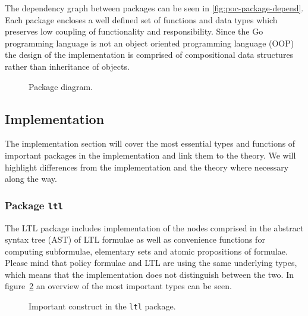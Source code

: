 The dependency graph between packages can be seen in \autoref{fig:poc-package-depend}. Each package encloses a well defined set of functions and data types which preserves low coupling of functionality and responsibility. Since the Go programming language is not an object oriented programming language (OOP) the design of the implementation is comprised of compositional data structures rather than inheritance of objects.

\begin{figure}[!ht]
    \centering
    
    \caption{Package diagram.}
    \label{fig:poc-package-depend}
\end{figure}

\subsection{Implementation}
The implementation section will cover the most essential types and functions of important packages in the implementation and link them to the theory. We will highlight differences from the implementation and the theory where necessary along the way.

\subsubsection{Package \texttt{ltl}}
The LTL package includes implementation of the nodes comprised in the abstract syntax tree (AST) of LTL formulae as well as convenience functions for computing subformulae, elementary sets and atomic propositions of formulae. Please mind that policy formulae and LTL are using the same underlying types, which means that the implementation does not distinguish between the two. In figure~\ref{fig:poc-ltl-package} an overview of the most important types can be seen.
\begin{figure}
    \caption{Important construct in the \texttt{ltl} package.}
    \label{fig:poc-ltl-package}
\end{figure}

